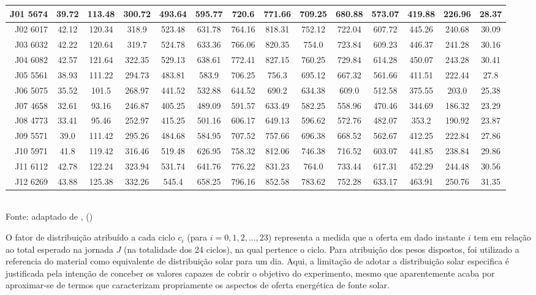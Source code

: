 \begin{table}[h]
\begin{tabular}{ r | *{13}{c} }
	\hline
	J01 5674 & 39.72 & 113.48 & 300.72 & 493.64 & 595.77 & 720.6 & 771.66 & 709.25 & 680.88 & 573.07 & 419.88 & 226.96 & 28.37\\
	\hline
	J02 6017 & 42.12 & 120.34 & 318.9 & 523.48 & 631.78 & 764.16 & 818.31 & 752.12 & 722.04 & 607.72 & 445.26 & 240.68 & 30.09 \\
	\hline
	J03 6032 &  42.22 & 120.64 & 319.7 & 524.78 & 633.36 & 766.06 & 820.35 & 754.0 & 723.84 & 609.23 & 446.37 & 241.28 & 30.16 \\
	\hline
	J04 6082 & 42.57 & 121.64 & 322.35 & 529.13 & 638.61 & 772.41 & 827.15 & 760.25 & 729.84 & 614.28 & 450.07 & 243.28 & 30.41 \\
	\hline
	J05 5561 & 38.93 & 111.22 & 294.73 & 483.81 & 583.9 & 706.25 & 756.3 & 695.12 & 667.32 & 561.66 & 411.51 & 222.44 & 27.8\\
	\hline
	J06 5075 & 35.52 & 101.5 & 268.97 & 441.52 & 532.88 & 644.52 & 690.2 & 634.38 & 609.0 & 512.58 & 375.55 & 203.0 & 25.38 \\
	\hline
	J07 4658 & 32.61 & 93.16 & 246.87 & 405.25 & 489.09 & 591.57 & 633.49 & 582.25 & 558.96 & 470.46 & 344.69 & 186.32 & 23.29 \\
	\hline
	J08 4773 & 33.41 & 95.46 & 252.97 & 415.25 & 501.16 & 606.17 & 649.13 & 596.62 & 572.76 & 482.07 & 353.2 & 190.92 & 23.87\\
	\hline
	J09 5571 & 39.0 & 111.42 & 295.26 & 484.68 & 584.95 & 707.52 & 757.66 & 696.38 & 668.52 & 562.67 & 412.25 & 222.84 & 27.86\\
	\hline
	J10 5971 & 41.8 & 119.42 & 316.46 & 519.48 & 626.95 & 758.32 & 812.06 & 746.38 & 716.52 & 603.07 & 441.85 & 238.84 & 29.86 \\
	\hline
	J11 6112 & 42.78 & 122.24 & 323.94 & 531.74 & 641.76 & 776.22 & 831.23 & 764.0 & 733.44 & 617.31 & 452.29 & 244.48 & 30.56 \\
	\hline
	J12 6269 & 43.88 & 125.38 & 332.26 & 545.4 & 658.25 & 796.16 & 852.58 & 783.62 & 752.28 & 633.17 & 463.91 & 250.76 & 31.35 \\
\bottomrule
\end{tabular}
\label{table:cap6distribuicaonatal}
\\
\footnotesize Fonte: adaptado de \citeauthor{martins2017atlas}, (\citeyear{martins2017atlas})

\end{table}
\endgroup

O fator de distribuição atribuído a cada ciclo $c_i$ (para $i=0,1,2,...,23$) representa a medida que a oferta em dado instante $i$ tem em relação ao total esperado na jornada $J$ (na totalidade dos 24 ciclos), na qual pertence o ciclo. Para atribuição dos pesos dispostos, foi utilizado a referencia do material  como equivalente de distribuição solar para um dia. Aqui, a limitação de adotar a distribuição solar especifica é justificada pela intenção de conceber os valores capazes de cobrir o objetivo do experimento, mesmo que aparentemente acaba por aproximar-se de termos que caracterizam propriamente os aspectos de oferta energética de fonte solar. 

